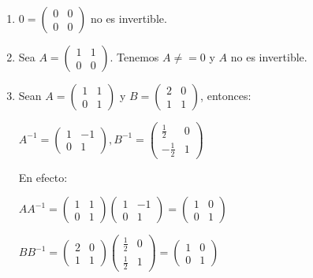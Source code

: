 \documentclass[12pt]{article}
\begin{document}
\begin{description}
\begin{enumerate}
\item $0 = 
\begin{pmatrix}
0 & 0 \\
0 & 0
\end{pmatrix}$ no es invertible.

\item Sea $A =
\begin{pmatrix}
1 & 1 \\
0 & 0
\end{pmatrix}$. Tenemos $A \ne = 0$ y $A$ no es invertible.

\item Sean $A =
\begin{pmatrix}
1 & 1 \\
0 & 1
\end{pmatrix}$ y $B =
\begin{pmatrix}
2 & 0 \\
1 & 1
\end{pmatrix}$, entonces:

\begin{math}
A^{-1} =
\begin{pmatrix}
1 & -1 \\
0 & 1
\end{pmatrix},
B^{-1} =
\begin{pmatrix}
\frac{1}{2} & 0 \\
-\frac{1}{2} & 1
\end{pmatrix}
\end{math}

En efecto:

\begin{math}
A A^{-1} =
\begin{pmatrix}
1 & 1 \\
0 & 1
\end{pmatrix}
\begin{pmatrix}
1 & -1 \\
0 & 1
\end{pmatrix}=
\begin{pmatrix}
1 & 0 \\
0 & 1
\end{pmatrix}
\end{math}

\begin{math}
B B^{-1} =
\begin{pmatrix}
2 & 0 \\
1 & 1
\end{pmatrix}
\begin{pmatrix}
\frac{1}{2} & 0 \\
\frac{1}{2} & 1
\end{pmatrix}=
\begin{pmatrix}
1 & 0 \\
0 & 1
\end{pmatrix}
\end{math}


\end{enumerate}
\end{description}
\end{document}
